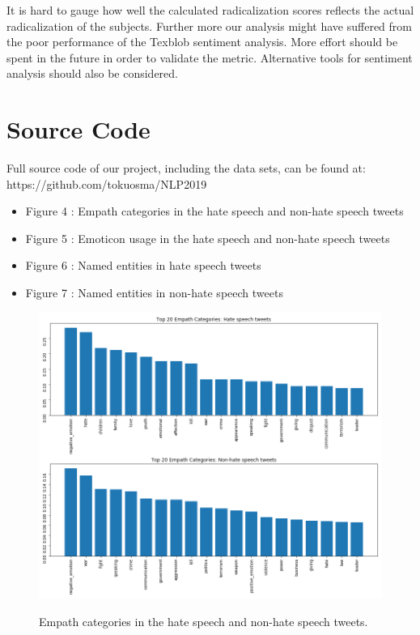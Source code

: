 \documentclass[conference]{IEEEtran}
\begin{document}
It is hard to gauge how well the calculated radicalization scores reflects the actual radicalization 
of the subjects. Further more our analysis might have suffered from the poor performance of the 
Texblob sentiment analysis. More effort should be spent in the future in order to validate the metric.
Alternative tools for sentiment analysis should also be considered.

\section*{Source Code} 
Full source code of our project, including the data sets, can be found at:
https://github.com/tokuosma/NLP2019



\vspace{12pt}

\appendix

\begin{itemize}
    \item Figure 4 : Empath categories in the hate speech and non-hate speech tweets 
    \item Figure 5 : Emoticon usage in the hate speech and non-hate speech tweets 
    \item Figure 6 : Named entities in hate speech tweets
    \item Figure 7 : Named entities in non-hate speech tweets
\end{itemize}

\begin{figure}[!t] 
\centering 
\includegraphics[width=5.0in]{liwc_topics} \label{fig:liwc_topics} \hfil 
\caption{Empath categories in the hate speech and non-hate speech tweets.}     
\end{figure} 
\end{document}
